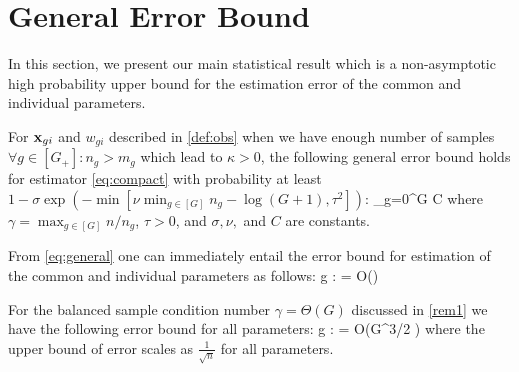 \section{General Error Bound}
\label{sec:error}
In this section, we present our main statistical result which is a non-asymptotic high probability upper bound for the estimation error of the common and individual parameters.
\begin{theorem}
	\label{theo:calcub}
	For $\mathbf{x}_{gi}$ and $w_{gi}$ described in \cref{def:obs} when we have enough number of samples $\forall g \in [G_+]: n_g > m_g$ which lead to $\kappa > 0$, the following general error bound holds for estimator \cref{eq:compact} with probability at least $1 - \sigma \exp\left(-\min\left[\nu  \min_{g \in [G]} n_g - \log (G+1), \tau^2\right]\right) $: 
	\be
	\label{eq:general}
	\sum_{g=0}^{G}  
	\leq C {\gamma} 
	\ee
	where $\gamma = \max_{g \in [G]} n/n_g$, $\tau > 0$, and $\sigma, \nu,$ and $C$ are constants. 
\end{theorem}

\begin{corollary}
	\label{corr:single}
	From \cref{eq:general} one can immediately entail the error bound for estimation of the common and individual parameters as follows:
	\be
	\nr
	\forall g \in [G_+]: \quad {} =  O\left(\gamma {}\right)
	\ee
\end{corollary}

\begin{example}
	For the balanced sample condition number $\gamma = \Theta(G)$ discussed in \cref{rem1} we have the following error bound for all parameters:
	\be 
		\forall g \in [G_+]: \quad {} =  O\left(G^{3/2} \right)
	\ee 
	where the upper bound of error scales as $\frac{1}{\sqrt{n}}$ for all parameters. %
\end{example}



